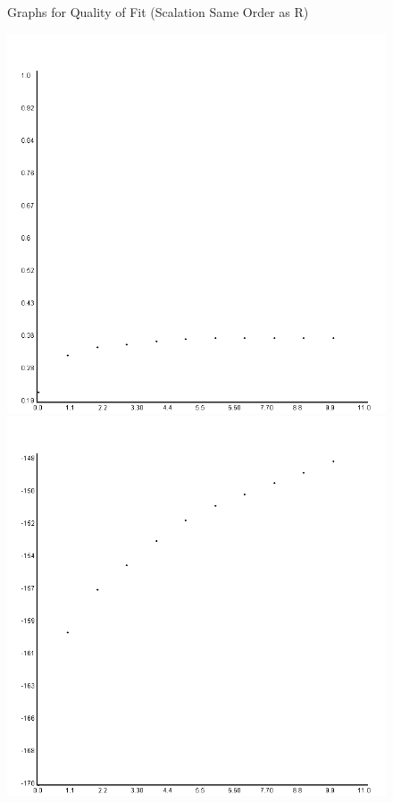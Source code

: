 \documentclass{article}
\begin{document}
	\begin{figure}
		\caption \newline Graphs for Quality of Fit (Scalation Same Order as R)
		
		
		\includegraphics[scale=0.25]{../plots/Wine/scala/ForwardRegressionRsq.png}
		\includegraphics[scale=0.25]{../plots/Wine/scala/ForwardRegressionaic.png}
		

\end{figure}
\end{document}
